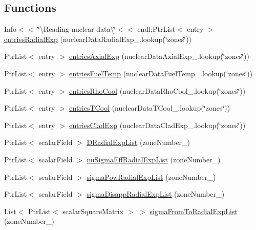 \subsection*{Functions}
\begin{DoxyCompactItemize}
\item 
Info$<$$<$ \char`\"{}\textbackslash{}Reading nuclear data\textbackslash{}\char`\"{}$<$$<$ endl;Ptr\+List$<$ entry $>$ \hyperlink{readNuclearDataLowMem_8H_a2ff34dd7194bd524d2933785fbe98bcf}{entries\+Radial\+Exp} (nuclear\+Data\+Radial\+Exp\+\_\+.\+lookup(\char`\"{}zones\char`\"{}))
\item 
Ptr\+List$<$ entry $>$ \hyperlink{readNuclearDataLowMem_8H_a795fc32dd0463f6b0b02e228f1c96dd2}{entries\+Axial\+Exp} (nuclear\+Data\+Axial\+Exp\+\_\+.\+lookup(\char`\"{}zones\char`\"{}))
\item 
Ptr\+List$<$ entry $>$ \hyperlink{readNuclearDataLowMem_8H_a128f8eba1518fa54aad20b070fa561cc}{entries\+Fuel\+Temp} (nuclear\+Data\+Fuel\+Temp\+\_\+.\+lookup(\char`\"{}zones\char`\"{}))
\item 
Ptr\+List$<$ entry $>$ \hyperlink{readNuclearDataLowMem_8H_a85e4dec42ca9ccc7a9cb48f3c830dbc4}{entries\+Rho\+Cool} (nuclear\+Data\+Rho\+Cool\+\_\+.\+lookup(\char`\"{}zones\char`\"{}))
\item 
Ptr\+List$<$ entry $>$ \hyperlink{readNuclearDataLowMem_8H_aa62f43acbd1ed45559c9e5841cd95ea5}{entries\+T\+Cool} (nuclear\+Data\+T\+Cool\+\_\+.\+lookup(\char`\"{}zones\char`\"{}))
\item 
Ptr\+List$<$ entry $>$ \hyperlink{readNuclearDataLowMem_8H_a7100b54a6f8c2d3c497136e21bc12af5}{entries\+Clad\+Exp} (nuclear\+Data\+Clad\+Exp\+\_\+.\+lookup(\char`\"{}zones\char`\"{}))
\item 
Ptr\+List$<$ scalar\+Field $>$ \hyperlink{readNuclearDataLowMem_8H_ae1060a118e4267dea408a4086efa6572}{D\+Radial\+Exp\+List} (zone\+Number\+\_\+)
\item 
Ptr\+List$<$ scalar\+Field $>$ \hyperlink{readNuclearDataLowMem_8H_a7df4fdff4b73ed38eede469ff0df38f4}{nu\+Sigma\+Eff\+Radial\+Exp\+List} (zone\+Number\+\_\+)
\item 
Ptr\+List$<$ scalar\+Field $>$ \hyperlink{readNuclearDataLowMem_8H_a808729e10cae93aa2cad2f4406e26325}{sigma\+Pow\+Radial\+Exp\+List} (zone\+Number\+\_\+)
\item 
Ptr\+List$<$ scalar\+Field $>$ \hyperlink{readNuclearDataLowMem_8H_ac3eddb59ac5141fd0409196a9f65766a}{sigma\+Disapp\+Radial\+Exp\+List} (zone\+Number\+\_\+)
\item 
List$<$ Ptr\+List$<$ scalar\+Square\+Matrix $>$ $>$ \hyperlink{readNuclearDataLowMem_8H_a784cd7b5c041a0f0734e85f81e68caa3}{sigma\+From\+To\+Radial\+Exp\+List} (zone\+Number\+\_\+)

\end{DoxyCompactItemize}
